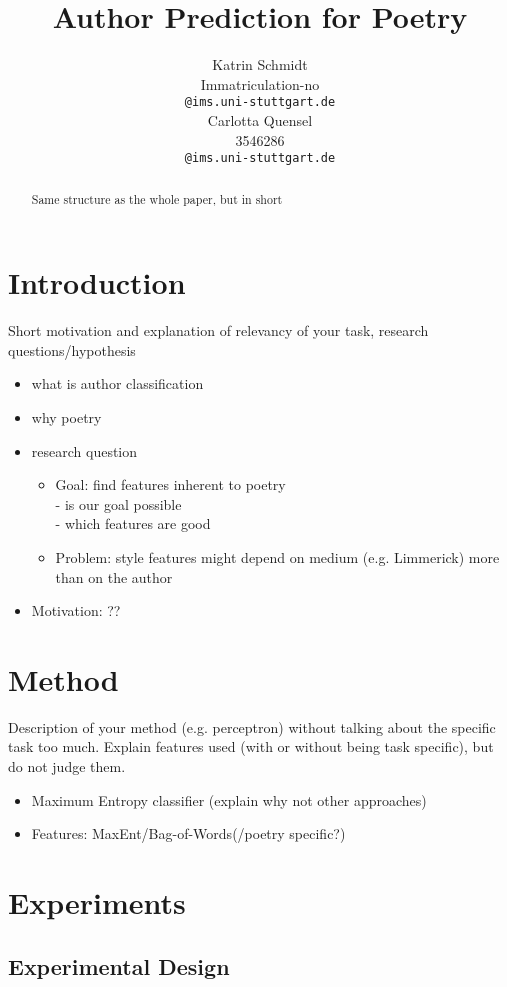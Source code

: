 \documentclass[11pt]{article}
\title{Author Prediction for Poetry}
\author{Katrin Schmidt \\
   Immatriculation-no\\
  \texttt{@ims.uni-stuttgart.de} \\\And
  Carlotta Quensel \\
  3546286 \\
  \texttt{@ims.uni-stuttgart.de} \\}
\begin{document}
\maketitle
\begin{abstract}
Same structure as the whole paper, but in short
\end{abstract}

\section{Introduction}
Short motivation and explanation of relevancy
of your task, research questions/hypothesis
\begin{itemize}
\item what is author classification
\item why poetry
\item research question
\begin{itemize}
\item Goal: find features inherent to poetry\\- is our goal possible\\- which features are good
\item Problem: style features might depend on medium (e.g. Limmerick) more than on the author
\end{itemize}
\item Motivation: ??
\end{itemize}


\section{Method}

Description of your method (e.g. perceptron) without talking about the specific task too much. Explain features used (with or without being task specific), but do not judge them.
\begin{itemize}
\item Maximum Entropy classifier (explain why not other approaches)
\item Features: MaxEnt/Bag-of-Words(/poetry specific?)
\end{itemize}

\section{Experiments}

\subsection{Experimental Design}
\end{document}
